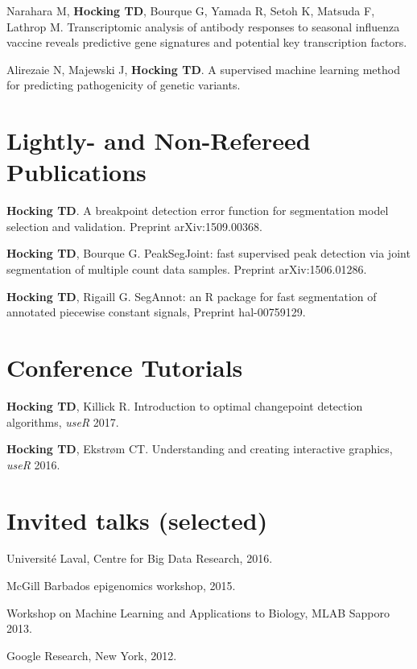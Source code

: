 \documentclass[margin,line]{res}
\begin{document}
\begin{resume}
Narahara M, {\bf Hocking TD}, Bourque G, Yamada R, Setoh K, Matsuda F,
Lathrop M. Transcriptomic analysis of antibody responses to seasonal
influenza vaccine reveals predictive gene signatures and potential key
transcription factors.

Alirezaie N, Majewski J, {\bf Hocking TD}. A supervised machine
learning method for predicting pathogenicity of genetic variants.

\section{\sc Lightly- and Non-Refereed Publications}

{\bf Hocking TD}. A breakpoint detection error function for
segmentation model selection and validation. Preprint
arXiv:1509.00368.

{\bf Hocking TD}, Bourque G. PeakSegJoint: fast supervised peak
detection via joint segmentation of multiple count data
samples. Preprint arXiv:1506.01286.

{\bf Hocking TD}, Rigaill G. SegAnnot: an R package for fast
segmentation of annotated piecewise constant signals, Preprint
hal-00759129.

\section{\sc Conference Tutorials}

{\bf Hocking TD}, Killick R. Introduction to optimal changepoint detection algorithms, {\it useR} 2017.

{\bf Hocking TD}, Ekstr\o m CT. Understanding and creating interactive
graphics, {\it useR} 2016.

\section{\sc Invited talks (selected)}

Universit\'e Laval, Centre for Big Data Research, 2016.

McGill Barbados epigenomics workshop, 2015.


Workshop on Machine Learning and Applications to Biology, MLAB Sapporo
2013.

Google Research, New York, 2012.


\end{resume}
\end{document}
